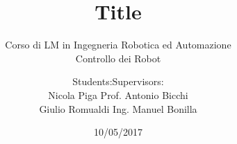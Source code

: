 \documentclass{beamer}
\date{10/05/2017}
\title[]{Title}
\subtitle{Corso di LM in Ingegneria Robotica ed Automazione \\
  Controllo dei Robot}
\author{Students:\hfill Supervisors:\\
Nicola Piga \hfill Prof. Antonio Bicchi\\
Giulio Romualdi \hfill Ing. Manuel Bonilla}
\institute[]{Università di Pisa}
\begin{document}

\begin{frame}
  \maketitle
\end{frame}


\end{document}
